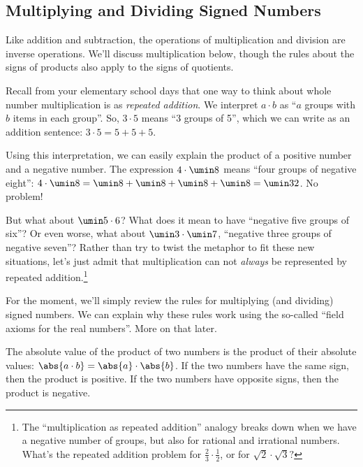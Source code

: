 \subsection{Multiplying and Dividing Signed Numbers}

Like addition and subtraction, the operations of multiplication and division are inverse operations. We'll discuss multiplication below, though the rules about the signs of products also apply to the signs of quotients.

Recall from your elementary school days that one way to think about whole number multiplication is as \textit{repeated addition}. We interpret $a \cdot b$ as ``$a$ groups with $b$ items in each group''. So, $3 \cdot 5$ means ``3 groups of 5'', which we can write as an addition sentence: $3 \cdot 5 = 5 + 5 + 5$.

Using this interpretation, we can easily explain the product of a positive number and a negative number. The expression $4\cdot\umin8$ means ``four groups of negative eight'': $4 \cdot \umin8 = \umin8 + \umin8 + \umin8 + \umin8 = \umin32$. No problem!

But what about $\umin5 \cdot 6$? What does it mean to have ``negative five groups of six''? Or even worse, what about $\umin3 \cdot \umin7$, ``negative three groups of negative seven''? Rather than try to twist the metaphor to fit these new situations, let's just admit that multiplication can not \textit{always} be represented by repeated addition.\footnote{The ``multiplication as repeated addition'' analogy breaks down when we have a negative number of groups, but also for rational and irrational numbers. What's the repeated addition problem for $\frac{2}{3} \cdot \frac{1}{2}$, or for $\sqrt{2} \cdot \sqrt{3}?$}

For the moment, we'll simply review the rules for multiplying (and dividing) signed numbers. We can explain why these rules work using the so-called ``field axioms for the real numbers''. More on that later.

\begin{boxeddef}
The absolute value of the product of two numbers is the product of their absolute values: $\abs{a \cdot b} = \abs{a} \cdot \abs{b}$. If the two numbers have the same sign, then the product is positive. If the two numbers have opposite signs, then the product is negative.
\end{boxeddef}

